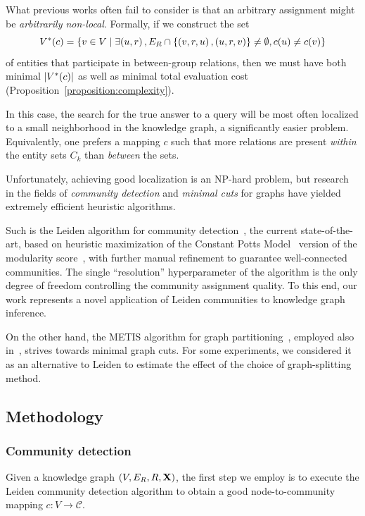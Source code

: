 What previous works often fail to consider is that an arbitrary assignment might be \emph{arbitrarily non-local}. Formally, if we construct the set $$V^*\mathopen{}\left(c\right)=\mathopen{}\left\{v \in V \mid \exists \mathopen{}\left(u,r\right), E_R \cap \mathopen{}\left\{\mathopen{}\left(v,r,u\right), \mathopen{}\left(u, r, v\right)\right\} \neq \emptyset, c\mathopen{}\left(u\right) \neq c\mathopen{}\left(v\right)\right\}$$ of entities that participate in between-group relations, then we must have both minimal $\mathopen{}\left|V^*\mathopen{}\left(c\right)\right|$ as well as minimal total evaluation cost (Proposition~\ref{proposition:complexity}). 

In this case, the search for the true answer to a query will be most often localized to a small neighborhood in the knowledge graph, a significantly easier problem. Equivalently, one prefers a mapping $c$ such that more relations are present \emph{within} the entity sets $C_k$ than \emph{between} the sets. 

Unfortunately, achieving good localization is an NP-hard problem, but research in the fields of \emph{community detection} and \emph{minimal cuts} for graphs have yielded extremely efficient heuristic algorithms. 

Such is the Leiden algorithm for community detection~\cite{traag_louvain_2019}, the current state-of-the-art, based on heuristic maximization of the Constant Potts Model~\cite{traag_narrow_2011} version of the modularity score~\cite{blondel_fast_2008}, with further manual refinement to guarantee well-connected communities. The single \enquote{resolution} hyperparameter of the algorithm is the only degree of freedom controlling the community assignment quality. To this end, our work represents a novel application of Leiden communities to knowledge graph inference. 

On the other hand, the METIS algorithm for graph partitioning~\cite{karypis_fast_1998}, employed also in~\cite{zheng_dgl-ke_2020}, strives towards minimal graph cuts. For some experiments, we considered it as an alternative to Leiden to estimate the effect of the choice of graph-splitting method.

\subsection{Methodology}
\label{sec:methodology}

\subsubsection{Community detection}

Given a knowledge graph $\mathopen{}\left(V, E_R, R, \mathbf{X}\right)$, the first step we employ is to execute the Leiden community detection algorithm to obtain a good node-to-community mapping $c: V \to \mathcal{C}$. 

